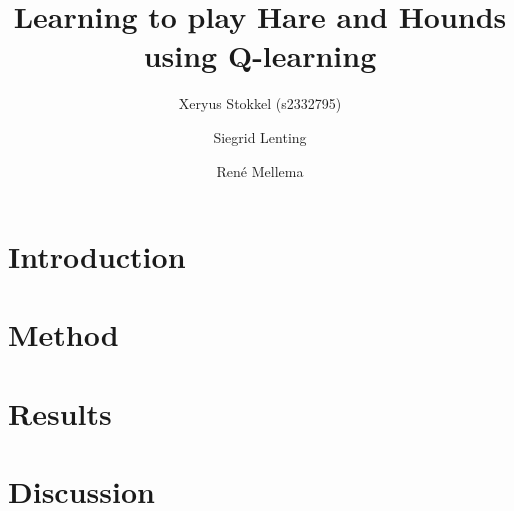 \documentclass[a4paper]{article}
\title{Learning to play Hare and Hounds using Q-learning}
\author{Xeryus Stokkel (s2332795) \and Siegrid Lenting \and Ren\'e Mellema}
\begin{document}
\maketitle

\section{Introduction}


\section{Method}\label{sec:method}


\section{Results}\label{sec:results}


\section{Discussion}\label{sec:discussion}




\end{document}
